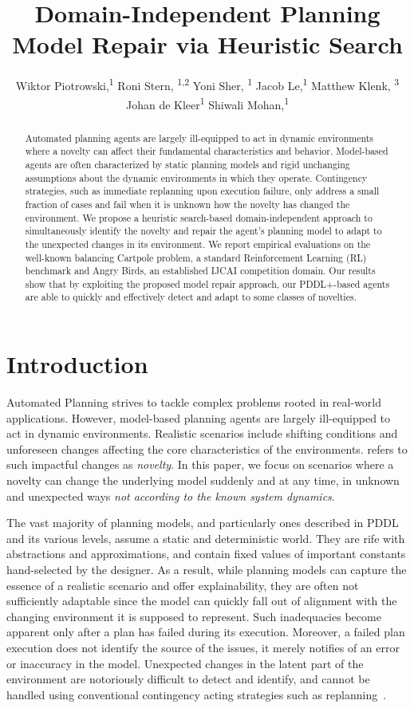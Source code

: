 \documentclass[letterpaper]{article} %
\title{Domain-Independent Planning Model Repair via Heuristic Search}
\author {
Wiktor Piotrowski,\textsuperscript{\rm 1}
Roni Stern, \textsuperscript{\rm 1,2}
Yoni Sher, \textsuperscript{\rm 1}
Jacob Le,\textsuperscript{\rm 1}
Matthew Klenk, \textsuperscript{\rm 3}
Johan de Kleer\textsuperscript{\rm 1}
Shiwali Mohan,\textsuperscript{\rm 1}
}
\begin{document}
\maketitle

\begin{abstract}
Automated planning agents are largely ill-equipped to act in dynamic environments where a novelty can affect their fundamental characteristics and behavior.
Model-based agents are often characterized by static planning models and rigid unchanging assumptions about the dynamic environments in which they operate. Contingency strategies, such as immediate replanning upon execution failure, only address a small fraction of cases and fail when it is unknown how the novelty has changed the environment. We propose a heuristic search-based domain-independent approach to simultaneously identify the novelty and repair the agent's planning model to adapt to the unexpected changes in its environment. We report empirical evaluations on the well-known balancing Cartpole problem, a standard Reinforcement Learning (RL) benchmark and Angry Birds, an established IJCAI competition domain. Our results show that by exploiting the proposed model repair approach, our PDDL+-based agents are able to quickly and effectively detect and adapt to some classes of novelties.
\end{abstract}

\section{Introduction}





Automated Planning strives to tackle complex problems rooted in real-world applications. However, model-based planning agents are largely ill-equipped to act in dynamic environments. Realistic scenarios include shifting conditions and unforeseen changes affecting the core characteristics of the environments. \citet{langley2020open} refers to such impactful changes as \emph{novelty}. In this paper, we focus on scenarios where a novelty can change the underlying model suddenly and at any time, in unknown and unexpected ways \emph{not according to the known system dynamics}.

The vast majority of planning models, and particularly ones described in PDDL~\cite{mcdermott1998pddl} and its various levels, assume a static and deterministic world. They are rife with abstractions and approximations, and contain fixed values of important constants hand-selected by the designer. As a result, while planning models can capture the essence of a realistic scenario and offer explainability, they are often not sufficiently adaptable since the model can quickly fall out of alignment with the changing environment it is supposed to represent. Such inadequacies become apparent only after a plan has failed during its execution. Moreover, a failed plan execution does not identify the source of the issues, it merely notifies of an error or inaccuracy in the model. Unexpected changes in the latent part of the environment are notoriously difficult to detect and identify, and cannot be handled using conventional contingency acting strategies such as replanning~\cite{nebel1995plan}.
\end{document}
